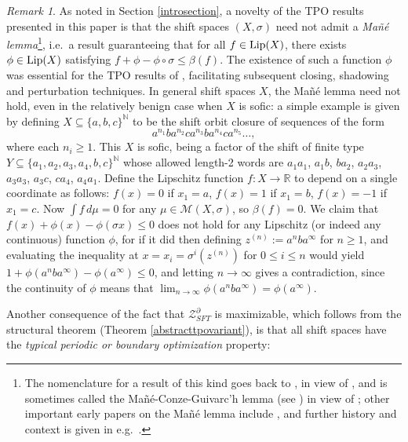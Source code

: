 \documentclass[reqno,11pt]{amsart}
\theoremstyle{definition}
\theoremstyle{remark}
\theoremstyle{remark}
\newtheorem{rem}[thm]{Remark}
\def \N {\mathbb N}
\def \R {\mathbb R}
\def\m{\mathcal M}
\def\lip{{\rm Lip}}
\def\ZZ{\mathcal{Z}}
\numberwithin{equation}{section}
\begin{document}
\begin{rem}\label{sofic_non_mane}
As noted in Section \ref{introsection},
a novelty of the TPO results presented in this paper is 
that the shift spaces $(X,\sigma)$ need not admit a \emph{Ma\~n\'e lemma}\footnote{The nomenclature for a result of this kind goes back to \cite{B00}, in view of
\cite{Ma92, Ma96},
and is sometimes called the Ma\~n\'e-Conze-Guivarc'h lemma (see \cite{B11, Mo09})
in view of \cite{conzeguivarch};
other important early papers on the Ma\~n\'e lemma include \cite{CLT01, LT03, Sav99}, and
further history and context is given in e.g.~\cite{Boc18, Jen06, Jen19}.},
i.e.~a result guaranteeing that for all $f\in\lip(X)$, there exists $\phi\in\lip(X)$ satisfying
$f+\phi-\phi\circ \sigma \le \beta(f)$.
The existence of such a function $\phi$ was essential for the TPO results of 
\cite{C02, HLMXZ19, LZ24}, facilitating subsequent closing, shadowing and perturbation techniques.
In general shift spaces $X$, the Ma\~n\'e lemma need not hold, even 
in the relatively benign case when $X$ is sofic:
a simple example is given by defining
$X\subseteq\{a,b,c\}^\N$ to be the shift orbit closure of sequences of the form
$$a^{n_1}ba^{n_2}ca^{n_3}ba^{n_4}ca^{n_5}\ldots,$$ where each $n_i\ge 1$.
This $X$ is sofic, being a factor of the shift of finite type $Y\subseteq\{a_1,a_2,a_3,a_4,b,c\}^\N$
whose allowed length-2 words are $a_1a_1$, $a_1b$, $ba_2$, $a_2a_3$, $a_3a_3$, $a_3c$, $ca_4$, $a_4a_1$.
Define the Lipschitz function $f:X\to\R$ to depend on a single coordinate as follows:
$f(x)=0$ if $x_1=a$, $f(x)=1$ if $x_1=b$, $f(x)=-1$ if $x_1=c$.
Now $\int f\, d\mu=0$ for any 
 $\mu\in\m(X,\sigma)$, so $\beta(f)=0$.
We claim that
$
f(x)+\phi(x)-\phi (\sigma x)\le 0
$
does not hold for any Lipschitz (or indeed any continuous) function $\phi$,
for if it did then
defining $z^{(n)}:=a^{n}ba^\infty$ for $n\ge 1$,
and evaluating the inequality at $x=x_i=\sigma^i(z^{(n)})$ for $0\le i\le n$ would yield
$1+ \phi(a^nba^\infty) - \phi(a^\infty) \le 0$,
and letting $n\to\infty$ gives a contradiction, since
 the continuity of $\phi$ means that $\lim_{n\to\infty} \phi(a^nba^\infty) = \phi(a^\infty)$.
\end{rem}

Another consequence of the fact that
$\ZZ_{SFT}^\partial$
is maximizable, which follows from the structural theorem (Theorem \ref{abstracttpovariant}),
is that
all shift spaces have the
\emph{typical periodic or boundary optimization} property:
\end{document}
